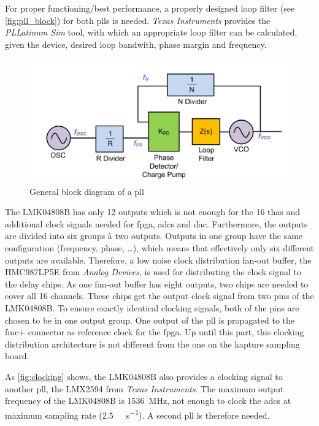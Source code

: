 For proper functioning/best performance, a properly designed loop filter (see \autoref{fig:pll_block}) for both \glspl{pll} is needed. 
\textit{Texas Instruments} provides the \textit{PLLatinum Sim} tool, with which an appropriate loop filter can be calculated, given the device, desired loop bandwith, phase margin and frequency.
\begin{figure}[tbh]
	\centering
	\includegraphics[width = \textwidth]{chap/04-work/img/pll_block}
	\caption[PLL block diagram]{General block diagram of a \gls{pll}}
	\label{fig:pll_block}
\end{figure}
The LMK04808B has only 12 outputs which is not enough for the 16 \glspl{tha} and additional clock signals needed for \gls{fpga}, \glspl{adc} and \gls{dac}. Furthermore, the outputs are divided into six groups à two outputs. 
Outputs in one group have the same configuration (frequency, phase, \ldots), which means that effectively only six different outputs are available.
Therefore, a low noise clock distribution fan-out buffer, the HMC987LP5E from \textit{Analog Devices}, is used for distributing the clock signal to the delay chips.
As one fan-out buffer has eight outputs, two chips are needed to cover all 16 channels. These chips get the output clock signal from two pins of the LMK04808B.
To ensure exactly identical clocking signals, both of the pins are chosen to be in one output group.
One output of the \gls{pll} is propagated to the \gls{fmc}+ connector as reference clock for the \gls{fpga}.
Up until this part, this clocking distribution architecture is not different from the one on the \gls{kapture} sampling board. 

As \autoref{fig:clocking} shows, the LMK04808B also provides a clocking signal to another \gls{pll}, the LMX2594 from \textit{Texas Instruments}.
The maximum output frequency of the LMK04808B is \SI{1536}{\mega \hertz}, not enough to clock the \glspl{adc} at maximum sampling rate (\SI{2.5}{\giga \sample \per \second}). 
A second \gls{pll} is therefore needed. 


